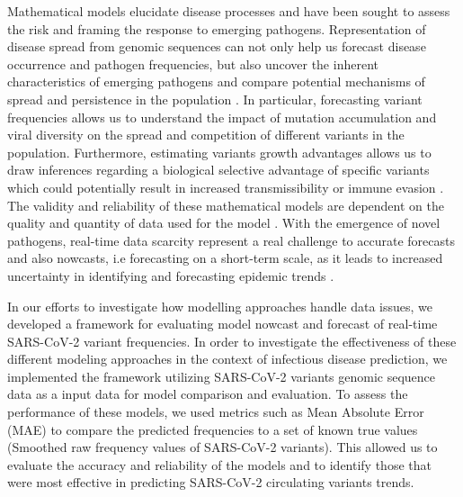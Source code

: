 \documentclass[11pt,oneside,letterpaper]{article}
\begin{document}
Mathematical models elucidate disease processes and have been sought to assess the risk and framing the response to emerging pathogens. 
Representation of disease spread from genomic sequences can not only help us forecast disease occurrence and pathogen frequencies, but also uncover the inherent characteristics of emerging pathogens and compare potential mechanisms of spread and persistence in the population \cite{metcalf_opportunities_2017}.
In particular, forecasting variant frequencies allows us to understand the impact of mutation accumulation and viral diversity on the spread and competition of different variants in the population.
Furthermore, estimating variants growth advantages allows us to draw inferences regarding a biological selective advantage of specific variants which could potentially result in increased transmissibility or immune evasion \cite{tegally_detection_2021}. 
The validity and reliability of these mathematical models are dependent on the quality and quantity of data used for the model \cite{tao_biological_2021}.
With the emergence of novel pathogens, real-time data scarcity represent a real challenge to accurate forecasts and also nowcasts, i.e forecasting on a short-term scale, as it leads to 
increased uncertainty in identifying and forecasting epidemic trends \cite{metcalf_opportunities_2017}.


In our efforts to investigate how modelling approaches handle data issues, we developed a framework for evaluating model nowcast and forecast of real-time SARS-CoV-2 variant frequencies.
In order to investigate the effectiveness of these different modeling approaches in the context of infectious disease prediction, we implemented the framework utilizing SARS-CoV-2 variants genomic sequence data as a input data for model comparison and evaluation.
To assess the performance of these models, we used metrics such as Mean Absolute Error (MAE) to compare the predicted frequencies to a set of known true values (Smoothed raw frequency values of SARS-CoV-2 variants). %
This allowed us to evaluate the accuracy and reliability of the models and to identify those that were most effective in predicting SARS-CoV-2 circulating variants trends.
\end{document}
